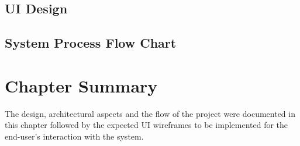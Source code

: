 \subsection{UI Design}

\subsection{System Process Flow Chart}

\section{Chapter Summary}
The design, architectural aspects and the flow of the project were documented in this chapter followed by the expected UI wireframes to be implemented for the end-user's interaction with the system.

